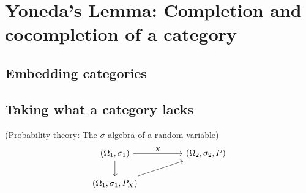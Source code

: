 
\section{Yoneda's Lemma: Completion and cocompletion of a category}

\subsection{Embedding categories}

\subsection{Taking what a category lacks}

\begin{example}{(Probability theory: The $\sigma$ algebra of a random variable)}
\[
\begin{tikzcd}
{(\Omega_{1},\sigma_{1})} \arrow[rr, "X"] \arrow[d] &  & {(\Omega_{2},\sigma_{2},P)} \\
{(\Omega_{1},\sigma_{1},P_{X})} \arrow[rru]         &  &                            
\end{tikzcd}
\]
\end{example}